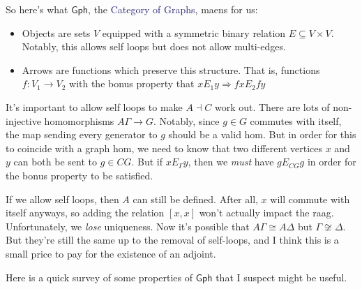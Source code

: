 \documentclass[12pt]{article}
\theoremstyle{definition}
\newcommand*{\important}[1]{\textcolor{MidnightBlue}{#1}}
\newcommand*{\TakeFourierOrnament}[1]{{%
\fontencoding{U}\fontfamily{futs}\selectfont\char#1}}
\newcommand*{\danger}{\TakeFourierOrnament{66}}
\begin{document}
So here's what $\mathsf{Gph}$, the \important{Category of Graphs}, maens for us:

\begin{itemize}
  \item Objects are sets $V$ equipped with a symmetric binary relation 
    $E \subseteq V \times V$. Notably, this allows self loops but 
    does not allow multi-edges.
  \item Arrows are functions which preserve this structure. That is,
    functions $f : V_1 \to V_2$ with the bonus property that 
    $x \mathrel{E_1} y \Longrightarrow fx \mathrel{E_2} fy$
\end{itemize}

It's important to allow self loops to make $A \dashv C$ work out. There
are lots of non-injective homomorphisms $A\Gamma \to G$. Notably,
since $g \in G$ commutes with itself, the map sending every generator to $g$
should be a valid hom. But in order for this to coincide with a graph hom,
we need to know that two different vertices $x$ and $y$ can both be sent to 
$g \in CG$. But if $x \mathrel{E_\Gamma} y$, then we \emph{must} have 
$g \mathrel{E_{CG}} g$ in order for the bonus property to be satisfied.

\danger \quad If we allow self loops, then $A$ can still be defined. After
all, $x$ will commute with itself anyways, so adding the relation $[x,x]$ 
won't actually impact the raag. Unfortunately, we \emph{lose} uniqueness.
Now it's possible that $A\Gamma \cong A\Delta$ but $\Gamma \not \cong \Delta$.
But they're still the same up to the removal of self-loops, and I think this
is a small price to pay for the existence of an adjoint.

Here is a quick survey of some properties of $\mathsf{Gph}$ that I suspect
might be useful.
\end{document}
